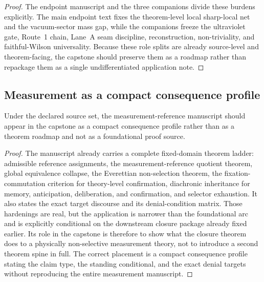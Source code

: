 \begin{proof}
The endpoint manuscript and the three companions divide these burdens explicitly. The main endpoint text fixes the theorem-level local sharp-local net and the vacuum-sector mass gap, while the companions freeze the ultraviolet gate, Route~1 chain, Lane~A seam discipline, reconstruction, non-triviality, and faithful-Wilson universality. Because these role splits are already source-level and theorem-facing, the capstone should preserve them as a roadmap rather than repackage them as a single undifferentiated application note.\cite{MaleyYangMillsNet,MaleyYMCompanionI,MaleyYMCompanionII,MaleyYMCompanionIII}
\end{proof}

\subsection{Measurement as a compact consequence profile}

\begin{proposition}
Under the declared source set, the measurement-reference manuscript should appear in the capstone as a compact consequence profile rather than as a theorem roadmap and not as a foundational proof source.
\end{proposition}

\begin{proof}
The manuscript \measurementdoc{} already carries a complete fixed-domain theorem ladder: admissible reference assignments, the measurement-reference quotient theorem, global equivalence collapse, the Everettian non-selection theorem, the fixation-commutation criterion for theory-level confirmation, diachronic inheritance for memory, anticipation, deliberation, and confirmation, and selector exhaustion. It also states the exact target discourse and its denial-condition matrix. Those hardenings are real, but the application is narrower than the foundational arc and is explicitly conditional on the downstream closure package already fixed earlier. Its role in the capstone is therefore to show what the closure theorem does to a physically non-selective measurement theory, not to introduce a second theorem spine in full. The correct placement is a compact consequence profile stating the claim type, the standing conditional, and the exact denial targets without reproducing the entire measurement manuscript.\cite{MaleyMeasurement}
\end{proof}


